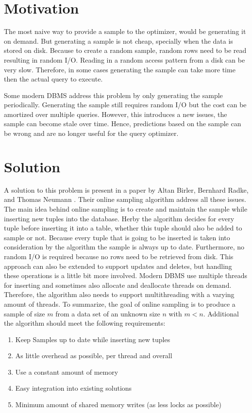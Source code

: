 \documentclass[sigconf,nonacm]{acmart}
\begin{document}
    \section{Motivation} 
        The most naive way to provide a sample to the optimizer, would be generating it on demand. But generating a sample is not cheap, specially when the data is stored on disk. Because to create a random sample, random rows need to be read resulting in random I/O. Reading in a random access pattern from a disk can be very slow. Therefore, in some cases generating the sample can take more time then the actual query to execute.

        Some modern DBMS address this problem by only generating the sample periodically. Generating the sample still requires random I/O but the cost can be amortized over multiple queries. However, this introduces a new issues, the sample can become stale over time. Hence, predictions based on the sample can be wrong and are no longer useful for the query optimizer.

    \section{Solution}
        A solution to this problem is present in a paper by Altan Birler, Bernhard Radke, and Thomas Neumann \cite{OG}. Their online sampling algorithm address all these issues. The main idea behind online sampling is to create and maintain the sample while inserting new tuples into the database. Herby the algorithm decides for every tuple before inserting it into a table, whether this tuple should also be added to sample or not. Because every tuple that is going to be inserted is taken into consideration by the algorithm the sample is always up to date. Furthermore, no random I/O is required because no rows need to be retrieved from disk. This approach can also be extended to support updates and deletes, but handling these operations is a little bit more involved. Modern DBMS use multiple threads for inserting and sometimes also allocate and deallocate threads on demand. Therefore, the algorithm also needs to support multithreading with a varying amount of threads.
        To summarize, the goal of online sampling is to produce a sample of size $m$ from a data set of an unknown size $n$ with $m<n$. Additional the algorithm should meet the following requirements:
        \begin{enumerate}
            \item Keep Samples up to date while inserting new tuples
            \item As little overhead as possible, per thread and overall
            \item Use a constant amount of memory
            \item Easy integration into existing solutions
            \item Minimum amount of shared memory writes (as less locks as possible)
        \end{enumerate}
        
\end{document}
